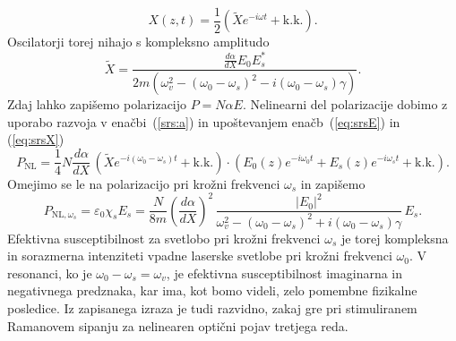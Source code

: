 \begin{equation}
X(z,t) = \frac{1}{2}\left(\tilde{X}e^{-i\omega t}+ \mathrm{k.k.}\right).
\label{eq:srsX}
\end{equation}
Oscilatorji torej nihajo s kompleksno amplitudo
\begin{equation}
\tilde{X} = \frac{\frac{d\alpha}{dX}E_0 E_s^*}{2m\left(
\omega_v^2-(\omega_0-\omega_s)^2-i(\omega_0-\omega_s)\gamma\right)}.
\end{equation}
Zdaj lahko zapišemo polarizacijo $P = N\alpha E$. Nelinearni del
polarizacije dobimo z uporabo razvoja v enačbi~(\ref{srs:a}) 
in upoštevanjem enačb~(\ref{eq:srsE}) in (\ref{eq:srsX}) 
\begin{equation}
P_{\mathrm{NL}} = \frac{1}{4} N \frac{d\alpha}{dX} \, \left(\tilde{X}
e^{-i(\omega_0-\omega_s)t}
+ \mathrm{k.k.}\right) \cdot \left( E_0(z)e^{-i\omega_0t}+ E_s(z)e^{-i\omega_st} + \mathrm{k.k.}\right).
\end{equation}
Omejimo se le na polarizacijo pri krožni frekvenci $\omega_s$ in zapišemo
\begin{equation}
P_{\mathrm{NL},\omega_s} = \varepsilon_0 \chi_s E_s = 
\frac{N }{8m}\left(\frac{d\alpha}{dX}\right)^2 \, 
\frac{|E_0|^2}{\omega_v^2-(\omega_0-\omega_s)^2+i(\omega_0-\omega_s)\gamma}\,E_s.
\label{srs:chi}
\end{equation}
Efektivna susceptibilnost za svetlobo pri krožni frekvenci $\omega_s$ 
je  torej kompleksna in sorazmerna intenziteti 
vpadne laserske svetlobe pri krožni frekvenci $\omega_0$. 
V resonanci, ko je $\omega_0-\omega_s = \omega_v$, je efektivna susceptibilnost
imaginarna in negativnega predznaka, kar ima, kot bomo videli, zelo pomembne 
fizikalne posledice. Iz zapisanega izraza je tudi razvidno, zakaj gre pri 
stimuliranem Ramanovem sipanju za nelinearen optični pojav tretjega reda. 

